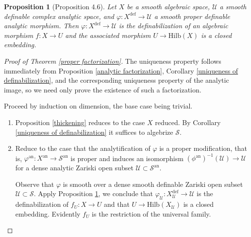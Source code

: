 \documentclass{amsart}
\newtheorem{proposition}[theorem]{Proposition}
\theoremstyle{definition}
\numberwithin{equation}{section}
\newcommand{\definable}{\mathrm{def}}
\newcommand{\analytic}{\mathrm{an}}
\begin{document}
\begin{proposition}[Proposition 4.6] \label{embedding into Hilb}
	Let $X$ be a smooth algebraic space,
	$\mathcal{U}$ a smooth definable complex analytic space,
	and $\varphi: X^{\definable} \to \mathcal{U}$ a smooth proper definable analytic morphism.
	Then $\varphi: X^{\definable} \to \mathcal{U}$ is the definabilization of an algebraic morphism $f: X \to U$ and
	the associated morphism $U \to \mathrm{Hilb}(X)$ is a closed embedding.
\end{proposition}

\begin{proof}[Proof of Theorem \ref{proper factorization}]
	The uniqueness property follows immediately from Proposition \ref{analytic factorization}, Corollary \ref{uniqueness of definabilization},
	and the corresponding uniqueness property of the analytic image, so we need only prove the existence of such a factorization.

	Proceed by induction on dimension, the base case being trivial.
	\begin{enumerate}
		\item
		      Proposition \ref{thickening} reduces to the case $X$ reduced.
		      By Corollary \ref{uniqueness of definabilization} it suffices to algebrize $\mathcal{S}$.

		\item
		      Reduce to the case that the analytification of $\varphi$ is a proper modification, that is,
		      $\varphi^\analytic: X^\analytic \to \mathcal{S}^\analytic$ is proper and induces an isomorphism
		      $(\phi^{\analytic})^{-1}(\mathcal{U})\to\mathcal{U}$ for a dense analytic Zariski open subset $\mathcal{U} \subset \mathcal{S}^{\analytic}$.

		      Observe that $\varphi$ is smooth over a dense smooth definable Zariski open subset $\mathcal{U} \subset \mathcal{S}$.
		      Apply Proposition \ref{embedding into Hilb}, we conclude that $\varphi_{\mathcal{U}} : X_{\mathcal{U}}^\definable \to \mathcal{U}$
		      is the definabilization of $f_U: X \to U$ and that $U \to \mathrm{Hilb}(X_{\mathcal{U}})$ is a closed embedding.
		      Evidently $f_U$ is the restriction of the universal family.


\end{enumerate}
\end{proof}
\end{document}
